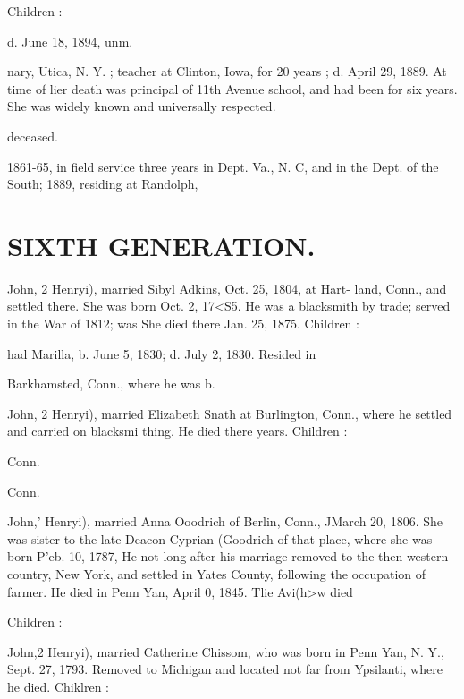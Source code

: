 \documentclass[oneside]{book}
\begin{document}
Children : 


d. June 18, 1894, unm. 


nary, Utica, N. Y. ; teacher at Clinton, Iowa, for 20 years ; 
d. April 29, 1889. At time of lier death was principal of 
11th Avenue school, and had been for six years. She was 
widely known and universally respected. 

deceased. 

1861-65, in field service three years in Dept. Va., N. C, 
and in the Dept. of the South; 1889, residing at Randolph, 




\section{SIXTH GENERATION.}


John, 2 Henryi), married Sibyl Adkins, Oct. 25, 1804, at Hart- 
land, Conn., and settled there. She was born Oct. 2, 17<S5. He 
was a blacksmith by trade; served in the War of 1812; was 
She died there Jan. 25, 1875. Children : 


had Marilla, b. June 5, 1830; d. July 2, 1830. Resided in 

Barkhamsted, Conn., where he was b. 

John, 2 Henryi), married Elizabeth Snath at Burlington, Conn., 
where he settled and carried on blacksmi thing. He died there 
years. Children : 




Conn. 

Conn. 

John,' Henryi), married Anna Ooodrich of Berlin, Conn., JMarch 
20, 1806. She was sister to the late Deacon Cyprian (Goodrich 
of that place, where she was born P'eb. 10, 1787, He not long 
after his marriage removed to the then western country, New 
York, and settled in Yates County, following the occupation of 
farmer. He died in Penn Yan, April 0, 1845. Tlie Avi(h>w died 

Children : 











John,2 Henryi), married Catherine Chissom, who was born in 
Penn Yan, N. Y., Sept. 27, 1793. Removed to Michigan and 
located not far from Ypsilanti, where he died. Chiklren : 
\end{document}
